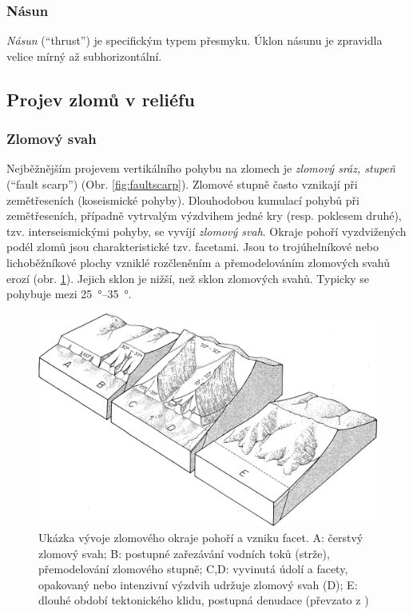 \subsubsection{Násun}
\emph{Násun} (\enquote{thrust}) je specifickým typem přesmyku. Úklon násunu je zpravidla velice mírný až subhorizontální. 

\subsection{Projev zlomů v reliéfu}
\subsubsection{Zlomový svah}
Nejběžnějším projevem vertikálního pohybu na zlomech je \emph{zlomový sráz, stupeň} (\enquote{fault scarp}) (Obr. \ref{fig:faultscarp}). Zlomové stupně často vznikají při zemětřeseních (koseismické pohyby). Dlouhodobou kumulací pohybů při zemětřeseních, případně vytrvalým výzdvihem jedné kry (resp. poklesem druhé), tzv. interseismickými pohyby, se vyvíjí \emph{zlomový svah}. Okraje pohoří vyzdvižených podél zlomů jsou charakteristické tzv. facetami. Jsou to trojúhelníkové nebo lichoběžníkové plochy vzniklé rozčleněním a přemodelováním zlomových svahů erozí (obr. \ref{fig:facety}). Jejich sklon je nižší, než sklon zlomových svahů. Typicky se pohybuje mezi \SIrange{25}{35}{\degree}.

\begin{figure}[h]
	\centering
	\includegraphics[width=1\linewidth]{obrazky/tectonic/facety}
	\caption{Ukázka vývoje zlomového okraje pohoří a vzniku facet. A: čerstvý zlomový svah; B: postupné zařezávání vodních toků (strže), přemodelování zlomového stupně; C,D: vyvinutá údolí a facety, opakovaný nebo intenzivní výzdvih udržuje zlomový svah (D); E: dlouhé období tektonického klidu, postupná denudace (převzato z \textcite{wallaceGeometryRatesChange1978})}
	\label{fig:facety}
\end{figure}




